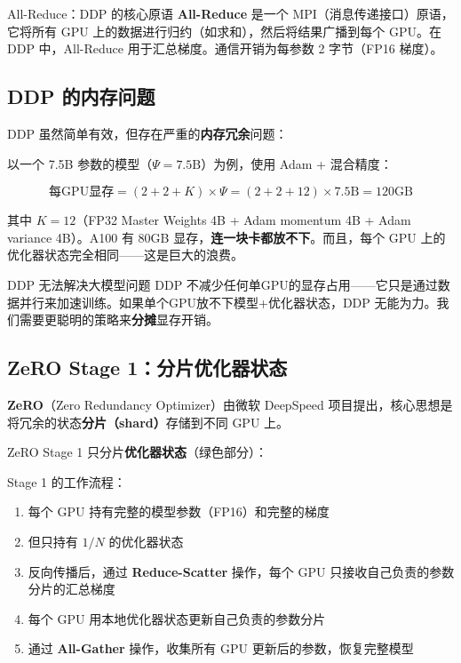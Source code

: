 \documentclass[a4paper]{article}
\begin{document}
\begin{importantbox}{All-Reduce：DDP 的核心原语}
\textbf{All-Reduce} 是一个 MPI（消息传递接口）原语，它将所有 GPU 上的数据进行归约（如求和），然后将结果广播到每个 GPU。在 DDP 中，All-Reduce 用于汇总梯度。通信开销为每参数 2 字节（FP16 梯度）。
\end{importantbox}

\subsection{DDP 的内存问题}

DDP 虽然简单有效，但存在严重的\textbf{内存冗余}问题：





以一个 7.5B 参数的模型（$\Psi = 7.5\text{B}$）为例，使用 Adam + 混合精度：

$$\text{每GPU显存} = (2 + 2 + K) \times \Psi = (2 + 2 + 12) \times 7.5\text{B} = 120 \text{GB}$$

其中 $K = 12$（FP32 Master Weights 4B + Adam momentum 4B + Adam variance 4B）。A100 有 80GB 显存，\textbf{连一块卡都放不下}。而且，每个 GPU 上的优化器状态完全相同——这是巨大的浪费。

\begin{warningbox}{DDP 无法解决大模型问题}
DDP 不减少任何单GPU的显存占用——它只是通过数据并行来加速训练。如果单个GPU放不下模型+优化器状态，DDP 无能为力。我们需要更聪明的策略来\textbf{分摊}显存开销。
\end{warningbox}

\subsection{ZeRO Stage 1：分片优化器状态}

\textbf{ZeRO}（Zero Redundancy Optimizer）由微软 DeepSpeed 项目提出，核心思想是将冗余的状态\textbf{分片（shard）}存储到不同 GPU 上。

ZeRO Stage 1 只分片\textbf{优化器状态}（绿色部分）：





Stage 1 的工作流程：
\begin{enumerate}
    \item 每个 GPU 持有完整的模型参数（FP16）和完整的梯度
    \item 但只持有 $1/N$ 的优化器状态
    \item 反向传播后，通过 \textbf{Reduce-Scatter} 操作，每个 GPU 只接收自己负责的参数分片的汇总梯度
    \item 每个 GPU 用本地优化器状态更新自己负责的参数分片
    \item 通过 \textbf{All-Gather} 操作，收集所有 GPU 更新后的参数，恢复完整模型
\end{enumerate}
\end{document}
